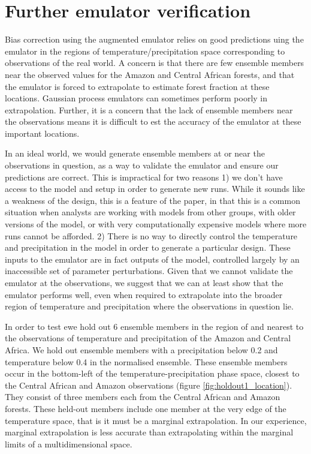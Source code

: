 \documentclass[gmd, manuscript]{copernicus} %
\begin{document}
\section{Further emulator verification}

Bias correction using the augmented emulator relies on good predictions uing the emulator in the regions of temperature/precipitation space corresponding to observations of the real world. A concern is that there are few ensemble members near the observed values for the Amazon and Central African forests, and that the emulator is forced to extrapolate to estimate forest fraction at these locations. Gaussian process emulators can sometimes perform poorly in extrapolation. Further, it is a concern that the lack of ensemble members near the observations means it is difficult to est the accuracy of the emulator at these important locations.

In an ideal world, we would generate ensemble members at or near the observations in question, as a way to validate the emulator and ensure our predictions are correct. This is impractical for two reasons 1) we don’t have access to the model and setup in order to generate new runs. While it sounds like a weakness of the design, this is a feature of the paper, in that this is a common situation when analysts are working with models from other groups, with older versions of the model, or with very computationally expensive models where more runs cannot be afforded. 2) There is no way to directly control the temperature and precipitation in the model in order to generate a particular design. These inputs to the emulator are in fact outputs of the model, controlled largely by an inaccessible set of parameter perturbations. Given that we cannot validate the emulator at the observations, we suggest that we can at least show that the emulator performs well, even when required to extrapolate into the broader region of temperature and precipitation where the observations in question lie.

In order to test ewe hold out 6 ensemble members in the region of and nearest to the observations  of temperature and precipitation of the Amazon and Central Africa. We hold out ensemble members with a precipitation below 0.2 and temperature below 0.4 in the normalised ensemble. These ensemble members occur in the bottom-left of the temperature-precipitation phase space, closest to the Central African and Amazon observations (figure \ref{fig:holdout1_location}). They consist of three members each from the Central African and Amazon forests. These held-out members include one member at the very edge of the temperature space, that is it must be a marginal extrapolation. In our experience, marginal extrapolation is less accurate than extrapolating within the marginal limits of a multidimensional space.
\end{document}
